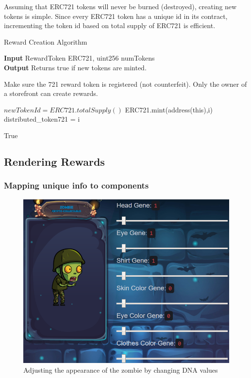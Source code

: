 \documentclass[12pt,tightenlines,letterpaper]{scrartcl}
\begin{document}
 
 
   Assuming that ERC721 tokens will never be burned (destroyed), creating new tokens is simple. Since every ERC721 token has a unique id in its contract, incrementing the token id based on total supply of ERC721 is efficient.
  \begin{algorithm}[ht]
    \caption{Reward Creation Algorithm}\label{alg:algorithm2}
    \hspace*{\algorithmicindent} \textbf{Input}  RewardToken ERC721, uint256 numTokens \\
    \hspace*{\algorithmicindent} \textbf{Output} Returns true if new tokens are minted.
    
    \begin{algorithmic}[1]
      \Require
        \Statex Make sure the 721 reward token is registered (not counterfeit).
        \Statex Only the owner of a storefront can create rewards.

      \State $newTokenId=ERC721.totalSupply()$
      \Repeat
      	 \State ERC721.mint(address(this),i) 
           \State distributed\_token721 = i
           
      \Return True
    \end{algorithmic}
  \end{algorithm}

\subsection{Rendering Rewards}

\subsubsection{Mapping unique info to components}



\begin{figure}[H]
\centering
\includegraphics[width=0.7\linewidth]{cryptozombies}
\caption{Adjusting the appearance of the zombie by changing DNA values}
\label{fig:cryptozombies}
\end{figure}
\end{document}
